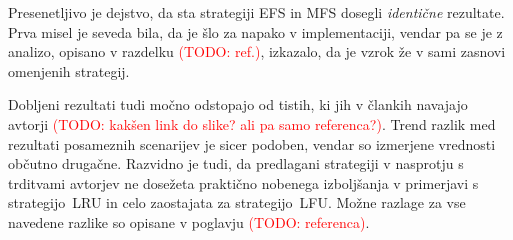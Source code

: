 \documentclass[a4paper, 12pt]{book}
\newcommand{\TODO}[1]{\textcolor{red}{(TODO: #1)}}
\begin{document}
Presenetljivo je dejstvo, da sta strategiji EFS in MFS dosegli
\textit{identične} rezultate. Prva misel je seveda bila, da je šlo za napako v
implementaciji, vendar pa se je z analizo, opisano v razdelku \TODO{ref.},
izkazalo, da je vzrok že v sami zasnovi omenjenih strategij.

Dobljeni rezultati tudi močno odstopajo od tistih, ki jih v člankih
navajajo avtorji \TODO{kakšen link do slike? ali pa samo referenca?}.
Trend razlik med rezultati posameznih scenarijev je sicer podoben, vendar so
izmerjene vrednosti občutno drugačne. Razvidno je tudi, da predlagani
strategiji v nasprotju s trditvami avtorjev ne dosežeta praktično nobenega
izboljšanja v primerjavi s strategijo~LRU in celo zaostajata za
strategijo~LFU. Možne razlage za vse navedene razlike so opisane v
poglavju \TODO{referenca}.


\end{document}
